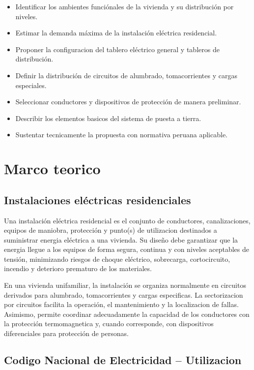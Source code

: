 \begin{itemize}
  \item Identificar los ambientes funciónales de la vivienda y su distribución por niveles.
  \item Estimar la demanda máxima de la instalación eléctrica residencial.
  \item Proponer la configuracion del tablero eléctrico general y tableros de distribución.
  \item Definir la distribución de circuitos de alumbrado, tomacorrientes y cargas especiales.
  \item Seleccionar conductores y dispositivos de protección de manera preliminar.
  \item Describir los elementos basicos del sistema de puesta a tierra.
  \item Sustentar tecnicamente la propuesta con normativa peruana aplicable.
\end{itemize}

\section{Marco teorico}

\subsection{Instalaciones eléctricas residenciales}

Una instalación eléctrica residencial es el conjunto de conductores, canalizaciones, equipos de maniobra, protección y punto(s) de utilizacion destinados a suministrar energia eléctrica a una vivienda. Su diseño debe garantizar que la energia llegue a los equipos de forma segura, continua y con niveles aceptables de tensión, minimizando riesgos de choque eléctrico, sobrecarga, cortocircuito, incendio y deterioro prematuro de los materiales.

En una vivienda unifamiliar, la instalación se organiza normalmente en circuitos derivados para alumbrado, tomacorrientes y cargas especificas. La sectorizacion por circuitos facilita la operación, el mantenimiento y la localizacion de fallas. Asimismo, permite coordinar adecuadamente la capacidad de los conductores con la protección termomagnetica y, cuando corresponde, con dispositivos diferenciales para protección de personas.

\subsection{Codigo Nacional de Electricidad -- Utilizacion}

